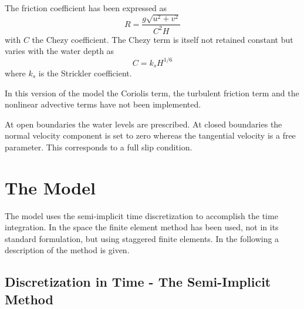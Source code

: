 The friction coefficient has been expressed as
\begin{equation}
	R = \frac{g \sqrt{u^{2}+v^{2}}}{C^{2} H}
\end{equation}
with $C$ the Chezy coefficient. The Chezy term is itself not retained
constant but varies with the water depth as
\begin{equation}
	C = k_{s} H^{1/6}
\end{equation}
where $k_{s}$ is the Strickler coefficient.

In this version of the model the Coriolis term, the turbulent friction term
and the nonlinear advective terms have not been implemented.

At open boundaries the water levels are prescribed. At closed boundaries
the normal velocity component is set to zero whereas the tangential velocity
is a free parameter. This corresponds to a full slip condition.







\section{The Model}

The model uses the semi-implicit time discretization to accomplish
the time integration. In the space the finite element method has
been used, not in its standard formulation, but using staggered finite
elements. In the following a description of the method is given.






\subsection{Discretization in Time - The Semi-Implicit Method}


